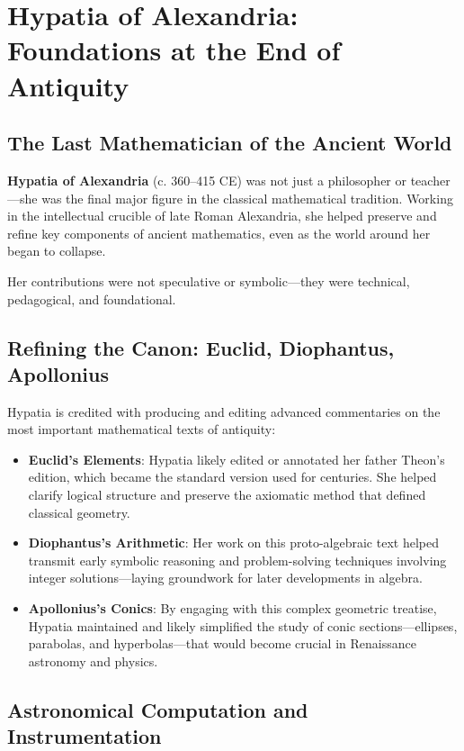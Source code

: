 \section{Hypatia of Alexandria: Foundations at the End of Antiquity}

\subsection{The Last Mathematician of the Ancient World}

\textbf{Hypatia of Alexandria} (c. 360–415 CE) was not just a philosopher or teacher—she was the final major figure in the classical mathematical tradition. Working in the intellectual crucible of late Roman Alexandria, she helped preserve and refine key components of ancient mathematics, even as the world around her began to collapse.

Her contributions were not speculative or symbolic—they were technical, pedagogical, and foundational.

\subsection{Refining the Canon: Euclid, Diophantus, Apollonius}

Hypatia is credited with producing and editing advanced commentaries on the most important mathematical texts of antiquity:

\begin{itemize}
    \item \textbf{Euclid’s Elements}: Hypatia likely edited or annotated her father Theon’s edition, which became the standard version used for centuries. She helped clarify logical structure and preserve the axiomatic method that defined classical geometry.
    
    \item \textbf{Diophantus’s Arithmetic}: Her work on this proto-algebraic text helped transmit early symbolic reasoning and problem-solving techniques involving integer solutions—laying groundwork for later developments in algebra.

    \item \textbf{Apollonius’s Conics}: By engaging with this complex geometric treatise, Hypatia maintained and likely simplified the study of conic sections—ellipses, parabolas, and hyperbolas—that would become crucial in Renaissance astronomy and physics.
\end{itemize}

\subsection{Astronomical Computation and Instrumentation}

